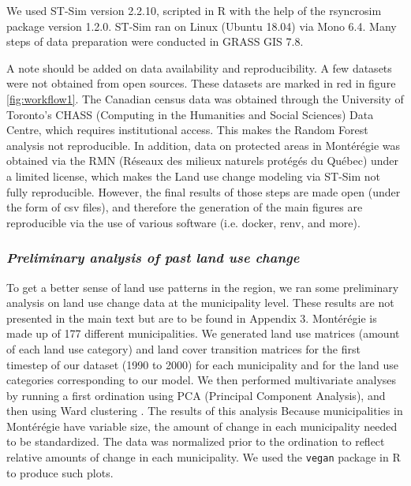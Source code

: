 We used ST-Sim version 2.2.10, scripted in R with the help of the rsyncrosim package version 1.2.0. ST-Sim ran on Linux (Ubuntu 18.04) via Mono 6.4. Many steps of data preparation were conducted in GRASS GIS 7.8.

A note should be added on data availability and reproducibility. A few datasets were not obtained from open sources. These datasets are marked in red in figure \ref{fig:workflow1}. The Canadian census data was obtained through the University of Toronto's CHASS (Computing in the Humanities and Social Sciences) Data Centre, which requires institutional access. This makes the Random Forest analysis not reproducible. In addition, data on protected areas in Montérégie was obtained  via the RMN (Réseaux des milieux naturels protégés du Québec) under a limited license, which makes the Land use change modeling via ST-Sim not fully reproducible. However, the final results of those steps are made open (under the form of csv files), and therefore the generation of the main figures are reproducible via the use of various software (i.e. docker, renv, and more). \\

\subsubsection*{\textit{Preliminary analysis of past land use change}}

To get a better sense of land use patterns in the region, we ran some preliminary analysis on land use change data at the municipality level. These results are not presented in the main text but are to be found in Appendix 3. 
Montérégie is made up of 177 different municipalities. We generated land use matrices (amount of each land use category) and land cover transition matrices for the first timestep of our dataset (1990 to 2000) for each municipality and for the land use categories corresponding to our model. We then performed multivariate analyses by running a first ordination using PCA (Principal Component Analysis), and then using Ward clustering \citep{legendre_ordination_2012}. The results of this analysis
Because municipalities in Montérégie have variable size, the amount of change in each municipality needed to be standardized. The data was normalized prior to the ordination to reflect relative amounts of change in each municipality. We used the \verb|vegan| package in R to produce such plots.\\


